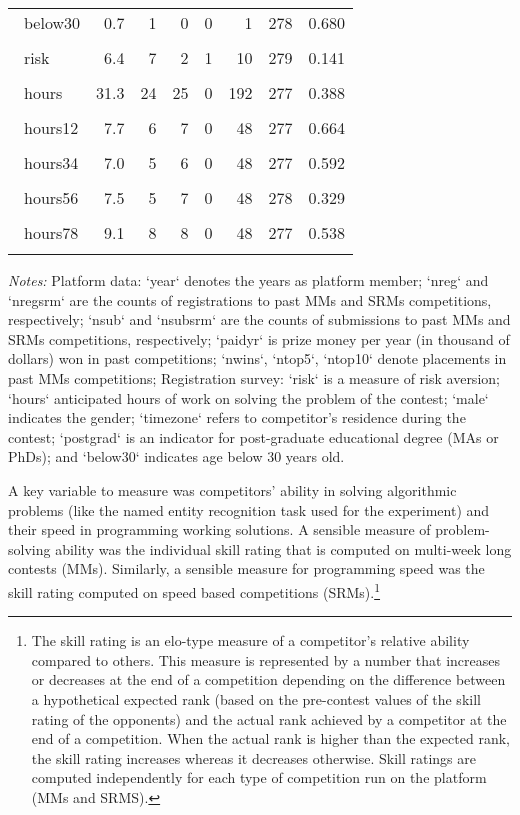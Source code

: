 \documentclass[10pt, titlepage]{article}
\begin{document}
\begin{table}
\begin{tabular}{@{}lrrrrrrr}
   \\[-1.86ex]~below30 & 0.7 & 1 & 0 & 0 & 1 & 278 & 0.680 \\ 
   \\[-1.86ex]~risk & 6.4 & 7 & 2 & 1 & 10 & 279 & 0.141 \\ 
   \\[-1.86ex]~hours & 31.3 & 24 & 25 & 0 & 192 & 277 & 0.388 \\ 
   \\[-1.86ex]~hours12 & 7.7 & 6 & 7 & 0 & 48 & 277 & 0.664 \\ 
   \\[-1.86ex]~hours34 & 7.0 & 5 & 6 & 0 & 48 & 277 & 0.592 \\ 
   \\[-1.86ex]~hours56 & 7.5 & 5 & 7 & 0 & 48 & 278 & 0.329 \\ 
   \\[-1.86ex]~hours78 & 9.1 & 8 & 8 & 0 & 48 & 277 & 0.538 \\ 
   \hline\\[-1.8ex]
\end{tabular}
\begin{minipage}{\textwidth}
\footnotesize\emph{Notes:}{ Platform data: `year` denotes the years as platform member; `nreg` and `nregsrm` are the counts of registrations to past MMs and SRMs competitions, respectively; `nsub` and `nsubsrm` are the counts of submissions to past MMs and SRMs competitions, respectively; `paidyr` is prize money per year (in thousand of dollars) won in past competitions; `nwins`, `ntop5`, `ntop10` denote placements in past MMs competitions; Registration survey: `risk` is a measure of risk aversion; `hours` anticipated hours of work on solving the problem of the contest; `male` indicates the gender; `timezone` refers to competitor's residence during the contest; `postgrad` is an indicator for post-graduate educational degree (MAs or PhDs); and `below30` indicates age below 30 years old.
}\end{minipage}
\end{table}

A key variable to measure was competitors' ability in solving
algorithmic problems (like the named entity recognition task used for
the experiment) and their speed in programming working solutions. A
sensible measure of problem-solving ability was the individual skill
rating that is computed on multi-week long contests (MMs). Similarly, a
sensible measure for programming speed was the skill rating computed on
speed based competitions (SRMs).\footnote{The skill rating is an
  elo-type measure of a competitor's relative ability compared to
  others. This measure is represented by a number that increases or
  decreases at the end of a competition depending on the difference
  between a hypothetical expected rank (based on the pre-contest values
  of the skill rating of the opponents) and the actual rank achieved by
  a competitor at the end of a competition. When the actual rank is
  higher than the expected rank, the skill rating increases whereas it
  decreases otherwise. Skill ratings are computed independently for each
  type of competition run on the platform (MMs and SRMS).}
\end{document}

